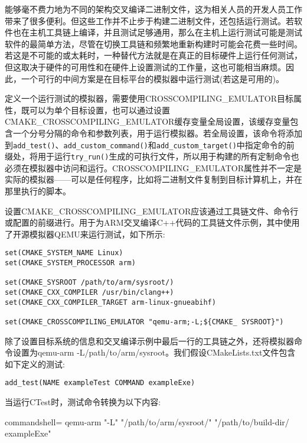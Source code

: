 
能够毫不费力地为不同的架构交叉编译二进制文件，这为相关人员的开发人员工作带来了很多便利。但这些工作并不止步于构建二进制文件，还包括运行测试。若软件也在主机工具链上编译，并且测试足够通用，那么在主机上运行测试可能是测试软件的最简单方法，尽管在切换工具链和频繁地重新构建时可能会花费一些时间。若这是不可能的或太耗时，一种替代方法就是在真正的目标硬件上运行任何测试，但这取决于硬件的可用性和在硬件上设置测试的工作量，这也可能相当麻烦。因此，一个可行的中间方案是在目标平台的模拟器中运行测试(若这是可用的)。

定义一个运行测试的模拟器，需要使用CROSSCOMPILING\_EMULATOR目标属性，既可以为单个目标设置，也可以通过设置CMAKE\_CROSSCOMPILING\_EMULATOR缓存变量全局设置，该缓存变量包含一个分号分隔的命令和参数列表，用于运行模拟器。若全局设置，该命令将添加到\texttt{add\_test()}、\texttt{add\_custom\_command()}和\texttt{add\_custom\_target()}中指定命令的前缀处，将用于运行\texttt{try\_run()}生成的可执行文件，所以用于构建的所有定制命令也必须在模拟器中访问和运行。CROSSCOMPILING\_EMULATOR属性并不一定是实际的模拟器——可以是任何程序，比如将二进制文件复制到目标计算机上，并在那里执行的脚本。

设置CMAKE\_CROSSCOMPILING\_EMULATOR应该通过工具链文件、命令行或配置的前缀进行。用于为ARM交叉编译C++代码的工具链文件示例，其中使用了开源模拟器QEMU来运行测试，如下所示:

\begin{lstlisting}[style=styleCMake]
set(CMAKE_SYSTEM_NAME Linux)
set(CMAKE_SYSTEM_PROCESSOR arm)

set(CMAKE_SYSROOT /path/to/arm/sysroot/)
set(CMAKE_CXX_COMPILER /usr/bin/clang++)
set(CMAKE_CXX_COMPILER_TARGET arm-linux-gnueabihf)

set(CMAKE_CROSSCOMPILING_EMULATOR "qemu-arm;-L;${CMAKE_	SYSROOT}")
\end{lstlisting}

除了设置目标系统的信息和交叉编译示例中最后一行的工具链之外，还将模拟器命令设置为qemu-arm -L/path/to/arm/sysroot。我们假设CMakeLists.txt文件包含如下定义的测试:

\begin{lstlisting}[style=styleCMake]
add_test(NAME exampleTest COMMAND exampleExe)
\end{lstlisting}

当运行CTest时，测试命令转换为以下内容:

\begin{tcblisting}{commandshell={}}
qemu-arm "-L" "/path/to/arm/sysroot/" "/path/to/build-dir/
  exampleExe"
\end{tcblisting}

